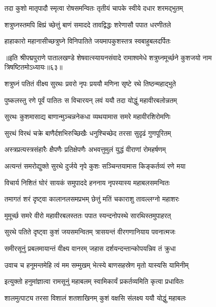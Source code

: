 \twolineshloka
{तदा कुशो मातृपादौ स्मृत्वा रोषसमन्वितः}
{तृतीयं चापके स्वीये दधार शरमद्भुतम्}%

\twolineshloka
{शत्रुघ्नस्तमपि क्षिप्रं च्छेत्तुं बाणं समाददे}
{तावद्विद्धः शरेणासौ पपात धरणीतले}%

\twolineshloka
{हाहाकारो महानासीच्छत्रुघ्ने विनिपातिते}
{जयमापकुशस्तत्र स्वबाहुबलदर्पितः}%

{॥इति श्रीपद्मपुराणे पातालखण्डे शेषवात्स्यायनसंवादे रामाश्वमेधे शत्रुघ्नमूर्च्छने कुशजयो नाम त्रिषष्टितमोऽध्यायः॥६३॥}



\twolineshloka
{शत्रुघ्नं पतितं वीक्ष्य सुरथः प्रवरो नृपः}
{प्रययौ मणिना सृष्टे रथे तिष्ठन्महाद्भुते}%

\twolineshloka
{पुष्कलस्तु रणे पूर्वं पातितः स विचारयन्}
{लवं ययौ तदा योद्धुं महावीरबलोन्नतम्}%

\twolineshloka
{सुरथः कुशमासाद्य बाणान्मुञ्चन्ननेकधा}
{व्यथयामास समरे महावीरशिरोमणिः}%

\twolineshloka
{सुरथं विरथं चक्रे बाणैर्दशभिरुच्छिखैः}
{धनुश्चिच्छेद तरसा सुदृढं गुणपूरितम्}%

\twolineshloka
{अस्त्रप्रत्यस्त्रसंहारैः क्षैपणैः प्रतिक्षेपणैः}
{अभवत्तुमुलं युद्धं वीराणां रोमहर्षणम्}%

\twolineshloka
{अत्यन्तं समरोद्युक्ते सुरथे दुर्जये नृपे}
{कुशः सञ्चिन्तयामास किङ्कर्तव्यं रणे मया}%

\twolineshloka
{विचार्य निशितं घोरं सायकं समुपाददे}
{हननाय नृपस्यास्य महाबलसमन्वितः}%

\twolineshloka
{तमागतं शरं दृष्ट्वा कालानलसमप्रभम्}
{छेत्तुं मतिं चकाराशु तावल्लग्नो महाशरः}%

\twolineshloka
{मुमूर्च्छ समरे वीरो महावीरबलस्ततः}
{पपात स्यन्दनोपस्थे सारथिस्तमुपाहरत्}%

\twolineshloka
{सुरथे पतिते दृष्ट्वा कुशं जयसमन्वितम्}
{त्रासयन्तं वीरगणानियाय पवनात्मजः}%

\twolineshloka
{समीरसूनुं प्रबलमायान्तं वीक्ष्य वानरम्}
{जहास दर्शयन्दन्तान्कोपयन्निव तं क्रुधा}%

\twolineshloka
{उवाच च हनूमन्तमेहि त्वं मम सम्मुखम्}
{भेत्स्ये बाणसहस्रेण मृतो यास्यसि यामिनीम्}%

\twolineshloka
{इत्युक्तो हनुमांज्ञात्वा रामसूनुं महाबलम्}
{स्वामिकार्यं प्रकर्तव्यमिति कृत्वा प्रधावितः}%

\twolineshloka
{शालमुत्पाट्य तरसा विशालं शतशाखिनम्}
{कुशं वक्षसि संलक्ष्य ययौ योद्धुं महाबलः}%

